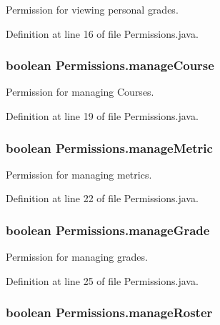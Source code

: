 Permission for viewing personal grades. 



Definition at line 16 of file Permissions.java.\hypertarget{classPermissions_bb9b1027fe18ccf88f8f5d4bfa2b2670}{
\subsubsection{\setlength{\rightskip}{0pt plus 5cm}boolean {\bf Permissions.manageCourse}}}
\label{classPermissions_bb9b1027fe18ccf88f8f5d4bfa2b2670}


Permission for managing Courses. 



Definition at line 19 of file Permissions.java.\hypertarget{classPermissions_aff2d90005bf252608cb96138e5dab8a}{
\subsubsection{\setlength{\rightskip}{0pt plus 5cm}boolean {\bf Permissions.manageMetric}}}
\label{classPermissions_aff2d90005bf252608cb96138e5dab8a}


Permission for managing metrics. 



Definition at line 22 of file Permissions.java.\hypertarget{classPermissions_f9be252bbd23a90b832a014331a72a19}{
\subsubsection{\setlength{\rightskip}{0pt plus 5cm}boolean {\bf Permissions.manageGrade}}}
\label{classPermissions_f9be252bbd23a90b832a014331a72a19}


Permission for managing grades. 



Definition at line 25 of file Permissions.java.\hypertarget{classPermissions_0ff314a0d75f9d8b5ca644bf53a4b9a3}{
\subsubsection{\setlength{\rightskip}{0pt plus 5cm}boolean {\bf Permissions.manageRoster}}}
\label{classPermissions_0ff314a0d75f9d8b5ca644bf53a4b9a3}


